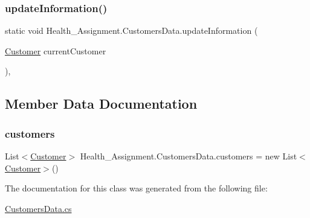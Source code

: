 \subsubsection{\texorpdfstring{update\+Information()}{updateInformation()}}
{\footnotesize\ttfamily static void Health\+\_\+\+Assignment.\+Customers\+Data.\+update\+Information (\begin{DoxyParamCaption}\item[{\hyperlink{class_health___assignment_1_1_customer}{Customer}}]{current\+Customer }\end{DoxyParamCaption})\hspace{0.3cm}{\ttfamily [inline]}, {\ttfamily [static]}}



\subsection{Member Data Documentation}
\mbox{\label{class_health___assignment_1_1_customers_data_aa28d9351caec2c93d5db78a3d936b7c5}} 
\subsubsection{\texorpdfstring{customers}{customers}}
{\footnotesize\ttfamily List$<$\hyperlink{class_health___assignment_1_1_customer}{Customer}$>$ Health\+\_\+\+Assignment.\+Customers\+Data.\+customers = new List$<$\hyperlink{class_health___assignment_1_1_customer}{Customer}$>$()\hspace{0.3cm}{\ttfamily [static]}}



The documentation for this class was generated from the following file\+:\begin{DoxyCompactItemize}
\item 
\hyperlink{_customers_data_8cs}{Customers\+Data.\+cs}\end{DoxyCompactItemize}
